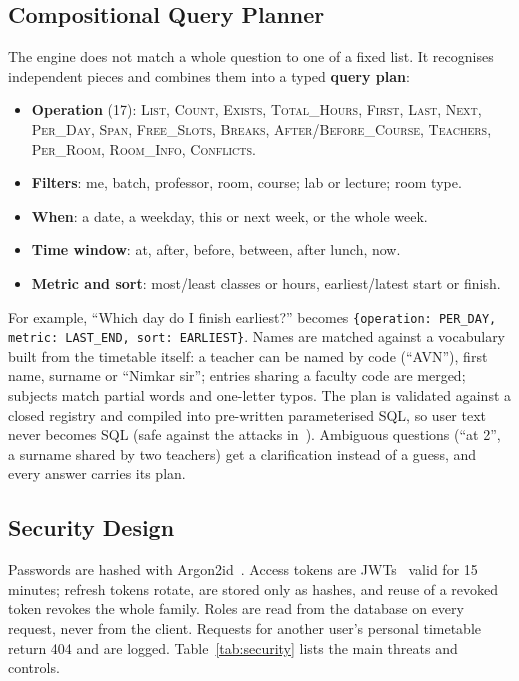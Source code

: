 \subsection{Compositional Query Planner}
The engine does not match a whole question to one of a fixed list. It recognises independent pieces
and combines them into a typed \textbf{query plan}:
\begin{itemize}
\item \textbf{Operation} (17): \textsc{List}, \textsc{Count}, \textsc{Exists}, \textsc{Total\_Hours},
      \textsc{First}, \textsc{Last}, \textsc{Next}, \textsc{Per\_Day}, \textsc{Span},
      \textsc{Free\_Slots}, \textsc{Breaks}, \textsc{After/Before\_Course}, \textsc{Teachers},
      \textsc{Per\_Room}, \textsc{Room\_Info}, \textsc{Conflicts}.
\item \textbf{Filters}: me, batch, professor, room, course; lab or lecture; room type.
\item \textbf{When}: a date, a weekday, this or next week, or the whole week.
\item \textbf{Time window}: at, after, before, between, after lunch, now.
\item \textbf{Metric and sort}: most/least classes or hours, earliest/latest start or finish.
\end{itemize}
For example, ``Which day do I finish earliest?'' becomes
\texttt{\{operation: PER\_DAY, metric: LAST\_END, sort: EARLIEST\}}. Names are matched against a
vocabulary built from the timetable itself: a teacher can be named by code (``AVN''), first name,
surname or ``Nimkar sir''; entries sharing a faculty code are merged; subjects match partial words and
one-letter typos. The plan is validated against a closed registry and compiled into pre-written
parameterised SQL, so user text never becomes SQL (safe against the attacks
in~\cite{greshake2023,pedro2023}). Ambiguous questions (``at 2'', a surname shared by two teachers)
get a clarification instead of a guess, and every answer carries its plan.



\subsection{Security Design}
Passwords are hashed with Argon2id~\cite{biryukov2016}. Access tokens are JWTs~\cite{rfc7519} valid for
15 minutes; refresh tokens rotate, are stored only as hashes, and reuse of a revoked token revokes the
whole family. Roles are read from the database on every request, never from the client. Requests for
another user's personal timetable return 404 and are logged. Table~\ref{tab:security} lists the main
threats and controls.

\newpage
